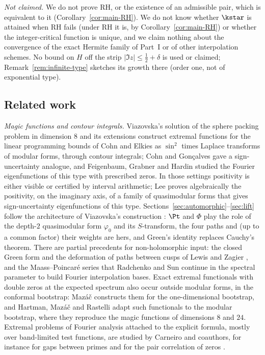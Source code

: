 \emph{Not claimed.} We do not prove RH, or the existence of an admissible pair, which is equivalent to it (Corollary~\ref{cor:main-RH}). We do
not know whether $\kstar$ is attained when RH fails (under RH it is, by Corollary~\ref{cor:main-RH}) or whether the integer-critical function
is unique, and we claim nothing about the convergence of the exact Hermite family of Part~I or of other interpolation schemes. No bound on $H$
off the strip $|\Im z|\le\frac12+\delta$ is used or claimed; Remark~\ref{rem:infinite-type} sketches its growth there (order one, not of
exponential type).

\subsection{Related work}\label{ssec:related}

\emph{Magic functions and contour integrals.} Viazovska's solution of the sphere packing problem in dimension $8$ \cite{Via17} and its
extensions \cite{CKMRV17,CKMRV22} construct extremal functions for the linear programming bounds of Cohn and Elkies \cite{CE03} as $\sin^2$ times
Laplace transforms of modular forms, through contour integrals; Cohn and Gon\c{c}alves \cite{CG19} gave a sign-uncertainty analogue, and
Feigenbaum, Grabner and Hardin \cite{FGH21} studied the Fourier eigenfunctions of this type with prescribed zeros. In those settings positivity
is either visible or certified by interval arithmetic; Lee \cite{Lee26} proves algebraically the positivity, on the imaginary axis, of a family of
quasimodular forms that gives sign-uncertainty eigenfunctions of this type. Sections~\ref{sec:automorphic}--\ref{sec:lift} follow the
architecture of Viazovska's construction \cite{Via17}: $\Pt$ and $\Phi$ play the role of the depth-$2$ quasimodular form $\varphi_0$ and its
$S$-transform, the four paths and (up to a common factor) their weights are hers, and Green's identity replaces Cauchy's theorem. There are
partial precedents for non-holomorphic input: the closed Green form and the deformation of paths between cusps of Lewis and Zagier
\cite{LZ01}, and the Maass--Poincar\'e series that Radchenko and Sun \cite{RS25} continue in the spectral parameter to build Fourier
interpolation bases. Exact extremal functionals with double zeros at the expected spectrum also occur outside modular forms, in the conformal
bootstrap: Maz\'a\v{c} \cite{Maz17} constructs them for the one-dimensional bootstrap, and Hartman, Maz\'a\v{c} and Rastelli \cite{HMR19} adapt
such functionals to the modular bootstrap, where they reproduce the magic functions of dimensions $8$ and $24$. Extremal problems of Fourier
analysis attached to the explicit formula, mostly over band-limited test functions, are studied by Carneiro and coauthors, for instance for gaps
between primes \cite{CMS19} and for the pair correlation of zeros \cite{CCLM17}.

